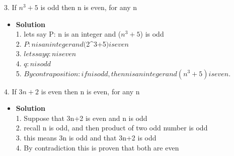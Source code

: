 \documentclass[11pt]{article}
\begin{document}
\begin{enumerate}

\begin{flushleft}
{\large 3. If $n^3 +5$ is odd then n is even, for any n \in {} }
\end{flushleft}

\begin{itemize}

\item \textbf{Solution}\\
\large 1. lets say P: n is an integer and ($n^3+5$) is odd\\
\large 2. \neg $P: n is an integer and ($2^3+5$) is even$\\
\large 3. $lets say q: n is even$\\
\large 4. \neg $q: n is odd$\\
\large 5. $By contraposition: if n is odd, then n is an integer and (n^3+5) is even.$\\

\end {itemize}
\end {enumerate}


\begin{enumerate}

\begin{flushleft}
{\large 4. If $3n+2$ is even then n is even, for any n \in {} }
\end{flushleft}

\begin{itemize}

\item \textbf{Solution}\\
\large 1. Suppose that 3n+2 is even and n is odd\\
\large 2. recall n is odd, and then product of two odd number is odd\\
\large 3. this means 3n is odd and that 3n+2 is odd\\
\large 4. By contradiction this is proven that both are even\\


\end {itemize}
\end {enumerate}
\end{document}
